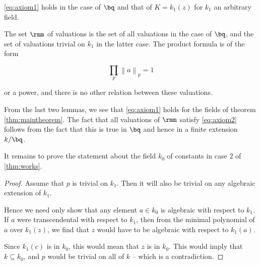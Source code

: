 \begin{thm}
  \ref{eq:axiom1} holds in the case of $\bq$ and that of $K=k_1(z)$ for $k_1$ an
  arbitrary field.
\end{thm}

The set $\rmm$ of valuations is the set of all valuations in the case of
$\bq$, and the set of valuations trivial on $k_1$ in the latter case. The
product formula is of the form

\[ \prod_p {\left\lVert a \right\rVert}_p = 1 \]

or a power, and there is no other relation between these valuations.

From the last two lemmas, we see that \ref{eq:axiom1} holds for the fields of
theorem \ref{thm:maintheorem}. The fact that all valuations of $\rmm$ satisfy
\ref{eq:axiom2} follows from the fact that this is true in $\bq$ and hence in a
finite extension $k/\bq$.

It remains to prove the statement about the field $k_0$ of constants in case $2$
of \ref{thm:works}.

\begin{proof}
  Assume that $p$ is trivial on $k_1$. Then it will also be trivial on any
  algebraic extension of $k_1$.

  Hence we need only show that any element $a \in k_0$ is algebraic with respect
  to $k_1$. If $a$ were transcendental with respect to $k_1$, then from the
  minimal polynomial of $a$ over $k_1(z)$, we find that $z$ would have to be
  algebraic with respect to $k_1(a)$.

  Since $k_1(c)$ is in $k_0$, this would mean that $z$ is in $k_0$. This would
  imply that $k\subseteq k_0$, and $p$ would be trivial on all of $k$ -- which
  is a contradiction.
\end{proof}



